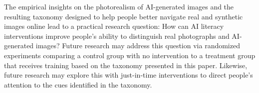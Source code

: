 The empirical insights on the photorealism of AI-generated images and the resulting taxonomy designed to help people better navigate real and synthetic images online lead to a practical research question: How can AI literacy interventions improve people's ability to distinguish real photographs and AI-generated images? Future research may address this question via randomized experiments comparing a control group with no intervention to a treatment group that receives training based on the taxonomy presented in this paper. Likewise, future research may explore this with just-in-time interventions to direct people's attention to the cues identified in the taxonomy.